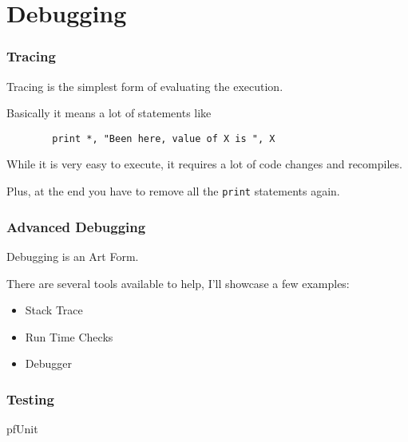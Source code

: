 \section{Debugging}

\begin{frame}[fragile]
    \frametitle{Tracing}
    Tracing is the simplest form of evaluating the execution.

    Basically it means a lot of statements like

    \begin{lstlisting}
        print *, "Been here, value of X is ", X
    \end{lstlisting}

    While it is very easy to execute, it requires a lot of code changes and recompiles.

    Plus, at the end you have to remove all the \texttt{print} statements again.
\end{frame}

\begin{frame}
    \frametitle{Advanced Debugging}
    Debugging is an Art Form.

    There are several tools available to help, I'll showcase a few examples:

    \begin{itemize}
        \item Stack Trace
        \item Run Time Checks
        \item Debugger
    \end{itemize}

\end{frame}

\begin{frame}
    \frametitle{Testing}
    pfUnit 
\end{frame}

